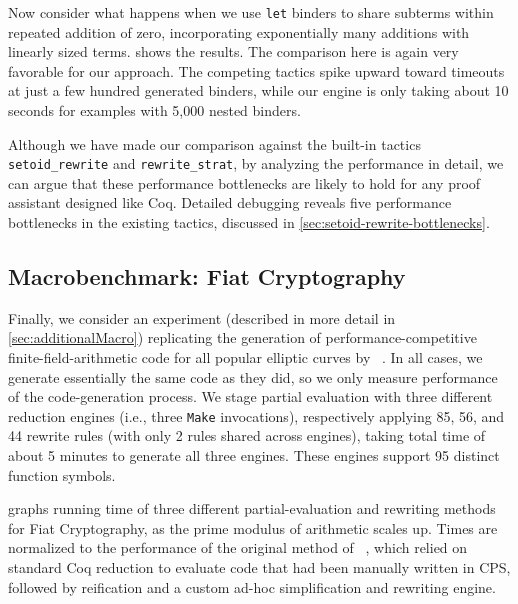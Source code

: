 \documentclass[a4paper,USenglish,cleveref,autoref,thm-restate]{lipics-v2021}
\newcommand{\citet}[1]{\usebibentry{#1}{citet}~\cite{#1}}
\newcommand{\taccbv}{\texttt{cbv}}
\begin{document}
Now consider what happens when we use \texttt{let} binders to share subterms within repeated addition of zero, incorporating exponentially many additions with linearly sized terms.
 shows the results.
The comparison here is again very favorable for our approach.
The competing tactics spike upward toward timeouts at just a few hundred generated binders, while our engine is only taking about 10 seconds for examples with 5,000 nested binders.

Although we have made our comparison against the built-in tactics \texttt{setoid_rewrite} and \texttt{rewrite_strat}, by analyzing the performance in detail, we can argue that these performance bottlenecks are likely to hold for any proof assistant designed like Coq.
Detailed debugging reveals five performance bottlenecks in the existing tactics, discussed in \autoref{sec:setoid-rewrite-bottlenecks}.

\subsection{Macrobenchmark: Fiat Cryptography}\label{sec:macro}

Finally, we consider an experiment (described in more detail in \autoref{sec:additionalMacro}) replicating the generation of performance-competitive finite-field-arithmetic code for all popular elliptic curves by \citet{FiatCryptoSP19}.
In all cases, we generate essentially the same code as they did, so we only measure performance of the code-generation process.
We stage partial evaluation with three different reduction engines (i.e., three \texttt{Make} invocations), respectively applying 85, 56, and 44 rewrite rules (with only 2 rules shared across engines), taking total time of about 5 minutes to generate all three engines.
These engines support 95 distinct function symbols.

 graphs running time of three different partial-evaluation and rewriting methods for Fiat Cryptography, as the prime modulus of arithmetic scales up.
Times are normalized to the performance of the original method of \citet{FiatCryptoSP19}, which relied on standard Coq reduction to evaluate code that had been manually written in CPS, followed by reification and a custom ad-hoc simplification and rewriting engine.
\end{document}
